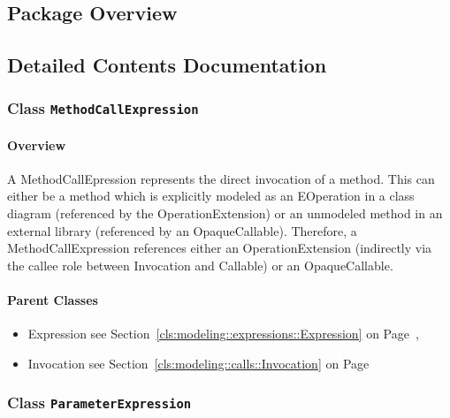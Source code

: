 \subsection{Package Overview}
	
			
		



\subsection{Detailed Contents Documentation}
\subsubsection{\Large{Class \bfseries \texttt{MethodCallExpression}\normalfont}}
\label{cls:modeling::calls::expressions::MethodCallExpression} 
\paragraph{Overview}

	
			
A MethodCallEpression represents the direct invocation of a method. This can either be a method which is explicitly modeled as an EOperation in a class diagram (referenced by the OperationExtension) or an unmodeled method in an external library (referenced by an OpaqueCallable). Therefore, a MethodCallExpression references either an OperationExtension (indirectly via the callee role between Invocation and Callable) or an OpaqueCallable.	
		
	



\paragraph{Parent Classes}
\begin{itemize}
\item Expression see Section~\ref{cls:modeling::expressions::Expression} on Page~\pageref{cls:modeling::expressions::Expression}, \item Invocation see Section~\ref{cls:modeling::calls::Invocation} on Page~\pageref{cls:modeling::calls::Invocation}\end{itemize}
\subsubsection{\Large{Class \bfseries \texttt{ParameterExpression}\normalfont}}
\label{cls:modeling::calls::expressions::ParameterExpression} 

